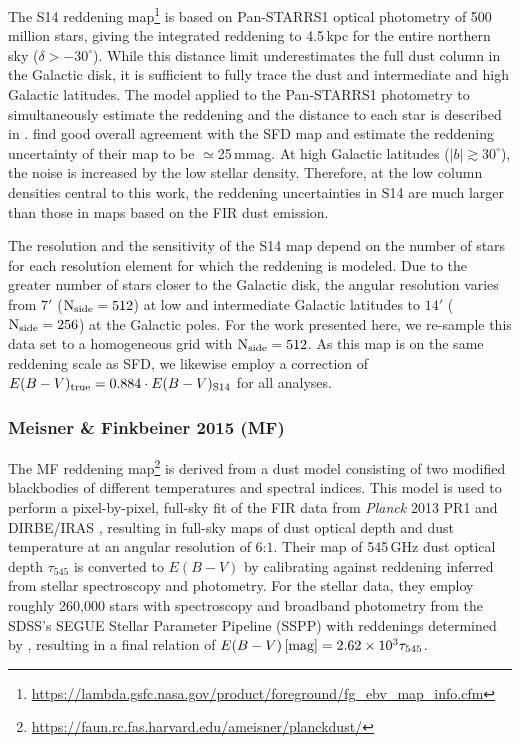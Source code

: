 \documentclass[iop,apj]{emulateapj}
\begin{document}
The S14 reddening map\footnote{\url{https://lambda.gsfc.nasa.gov/product/foreground/fg\_ebv\_map\_info.cfm}} is based on Pan-STARRS1 optical photometry of 500 million stars, giving the integrated reddening to 4.5\,kpc for the entire northern sky ($\delta > -30^{\circ}$). While this distance limit underestimates the full dust column in the Galactic disk, it is sufficient to fully trace the dust and intermediate and high Galactic latitudes. The model applied to the Pan-STARRS1 photometry to simultaneously estimate the reddening and the distance to each star is described in \citet{Green+etal_2014}. \citet{Schlafly+etal_2014} find good overall agreement with the SFD map and estimate the reddening uncertainty of their map to be $\simeq$25\,mmag. At high Galactic latitudes ($|b| \gtrsim 30^\circ$), the noise is increased by the low stellar density. Therefore, at the low column densities central to this work, the reddening uncertainties in S14 are much larger than those in maps based on the FIR dust emission.

The resolution and the sensitivity of the S14 map depend on the number of stars for each resolution element for which the reddening is modeled. Due to the greater number of stars closer to the Galactic disk, the angular resolution varies from $7'$ ($\rm N_{side}=512$) at low and intermediate Galactic latitudes to $14'$ ($\rm N_{side}=256$) at the Galactic poles. For the work presented here, we re-sample this data set to a homogeneous grid with $\rm N_{side}=512$. As this map is on the same reddening scale as SFD, we likewise employ a correction of $E(B-V)_{\rm true} = 0.884\cdot E(B-V)_{\rm S14}$ for all analyses.

\subsubsection{Meisner \& Finkbeiner 2015 (MF)}
\label{subsubsec:MF}
The MF reddening map\footnote{\url{https://faun.rc.fas.harvard.edu/ameisner/planckdust/}} is derived from a dust model consisting of two modified blackbodies of different temperatures and spectral indices. This model is used to perform a pixel-by-pixel, full-sky fit of the FIR data from \textit{Planck} 2013 PR1 and DIRBE/IRAS \citep{Neugebauer+etal_1984, Silverberg+etal_1993, Planck_2011_VI}, resulting in full-sky maps of dust optical depth and dust temperature at an angular resolution of $6\overset{'}{.}1$. Their map of 545\,GHz dust optical depth $\tau_{545}$ is converted to $E(B-V)$ by calibrating against reddening inferred from stellar spectroscopy and photometry. For the stellar data, they employ roughly 260,000 stars with spectroscopy and broadband photometry from the SDSS's SEGUE Stellar Parameter Pipeline (SSPP) with reddenings determined by \citet{Schlafly+Finkbeiner_2011}, resulting in a final relation of $E(B-V)\,[\rm mag] = 2.62\times10^3\tau_{545}$.
\end{document}
